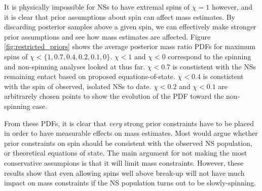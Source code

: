 It is physically impossible for NSs to have extremal spins of $\chi = 1$ however, and it is clear that prior assumptions about spin can affect mass estimates.  By discarding posterior samples above a given spin, we can effectively make stronger prior assumptions and see how mass estimates are affected.  Figure \ref{fig:restricted_priors} shows the average posterior mass ratio PDFs for maximum spins of $\chi < \{1, 0.7, 0.4, 0.2, 0.1, 0\}$.  $\chi<1$ and $\chi<0$ correspond to the spinning and non-spinning analyses looked at thus far.  $\chi<0.7$ is constistent with the NSs remaining entact based on proposed equations-of-state.  $\chi<0.4$ is constistent with the spin of observed, isolated NSs to date.  $\chi<0.2$ and $\chi<0.1$ are arbitrarely chosen points to show the evolution of the PDF toward the non-spinning case.

From these PDFs, it is clear that \emph{very} strong prior constraints have to be placed in order to have measurable effects on mass estimates.  Most would argue whether prior constraints on spin should be consistent with the observed NS population, or theoretical equations of state.  The main argument for not making the most conservative assumpions is that it will limit mass constraints.  However, these results show that even allowing spins well above break-up will not have much impact on mass constraints if the NS population turns out to be slowly-spinning.